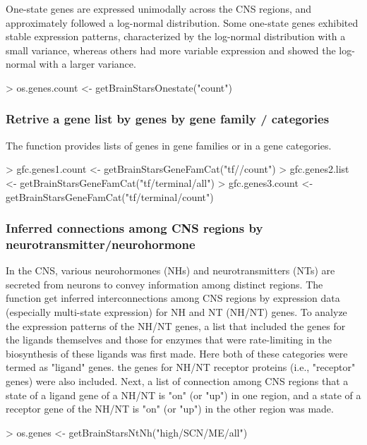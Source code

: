 \documentclass[12pt,fullpage]{article}
\begin{document}
One-state genes are expressed unimodally across the CNS regions, and approximately followed a log-normal distribution. Some one-state genes exhibited stable expression patterns, characterized by the log-normal distribution with a small variance, whereas others had more variable expression and showed the log-normal with a larger variance.
\begin{Schunk}
\begin{Sinput}
> os.genes.count <- getBrainStarsOnestate("count")
\end{Sinput}
\end{Schunk}

\subsubsection{Retrive a gene list by genes by gene family / categories}
The function provides lists of genes in gene families or in a gene categories. 
\begin{Schunk}
\begin{Sinput}
> gfc.genes1.count <- getBrainStarsGeneFamCat("tf//count")
> gfc.genes2.list  <- getBrainStarsGeneFamCat("tf/terminal/all")
> gfc.genes3.count <- getBrainStarsGeneFamCat("tf/terminal/count")
\end{Sinput}
\end{Schunk}

\subsubsection{Inferred connections among CNS regions by neurotransmitter/neurohormone}
In the CNS, various neurohormones (NHs) and neurotransmitters (NTs) are secreted from neurons to convey information among distinct regions. The function get inferred interconnections among CNS regions by expression data (especially multi-state expression) for NH and NT (NH/NT) genes. To analyze the expression patterns of the NH/NT genes, a list that included the genes for the ligands themselves and those for enzymes that were rate-limiting in the biosynthesis of these ligands was first made. Here both of these categories were termed as "ligand" genes. the genes for NH/NT receptor proteins (i.e., "receptor" genes) were also included. Next, a list of connection among CNS regions that a state of a ligand gene of a NH/NT is "on" (or "up") in one region, and a state of a receptor gene of the NH/NT is "on" (or "up") in the other region was made.
\begin{Schunk}
\begin{Sinput}
> os.genes <- getBrainStarsNtNh("high/SCN/ME/all")
\end{Sinput}
\end{Schunk}
\end{document}
